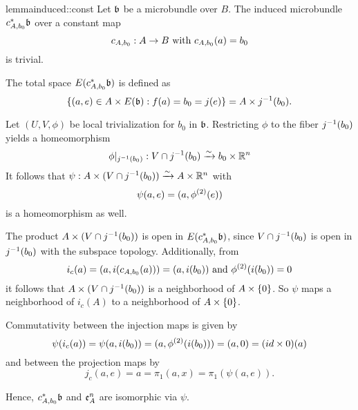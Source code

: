 \begin{mystatement}{lemma}{induced::const}
    Let $\bb$ be a microbundle over $B$.
    The induced microbundle $\ind{c_{A, b_0}}\bb$ over a constant map
    \[ c_{A, b_0}: A \to B \text{ with } c_{A, b_0}(a) = b_0 \]
    is trivial.
\end{mystatement}

\begin{myproof}
    The total space $E(\ind{c_{A, b_0}}\bb)$ is defined as
    \[ \set{(a, e) \in A \cross E(\bb)}{f(a) = b_0 = j(e)} = A \cross \inv{j}(b_0). \]

    Let $(U, V, \phi)$ be local trivialization for $b_0$ in $\bb$.
    Restricting $\phi$ to the fiber $j^{-1}(b_0)$ yields a homeomorphism
    \[ \phi\vert_{j^{-1}(b_0)}: V \cap j^{-1}(b_0) \xrightarrow{\sim} b_0 \times \mathbb{R}^n \]
    It follows that $\psi: A \times (V \cap j^{-1}(b_0)) \xrightarrow{\sim} A \times \mathbb{R}^n$ with
    \[ \psi(a, e) = (a, \phi^{(2)}(e)) \]
    is a homeomorphism as well.

    The product $A \times (V \cap j^{-1}(b_0))$ is open in $E(\ind{c_{A, b_0}}\bb)$,
    since  $V \cap j^{-1}(b_0)$ is open in $j^{-1}(b_0)$ with the subspace topology.
    Additionally, from
    \[ i_{c}(a) = (a, i(c_{A, b_0}(a))) = (a, i(b_0)) \text{ and } \phi^{(2)}(i(b_0)) = 0 \]
    it follows that $A \times (V \cap j^{-1}(b_0))$ is a neighborhood of $A \times{} \{0\}$.
    So $\psi$ maps a neighborhood of $i_c(A)$
    to a neighborhood of $A \times{} \{0\}$.
    
    Commutativity between the injection maps is given by
    \[ \psi(i_c(a)) = \psi(a, i(b_0)) = (a, \phi^{(2)}(i(b_0))) = (a, 0) = (id \times 0)(a) \]
    and between the projection maps by
    \[ j_c(a, e) = a = \pi_1(a, x) = \pi_1(\psi(a, e)). \]

    Hence, $\ind{c_{A, b_0}}\bb$ and $\mathfrak{e}^{n}_{A}$ are isomorphic via $\psi$. 
\end{myproof}